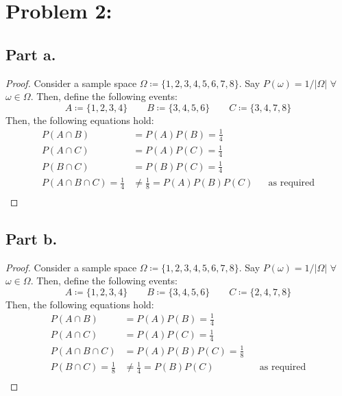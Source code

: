 \documentclass{article}
\begin{document}
\section*{Problem 2:}

\subsection*{Part a.}
\begin{proof}
Consider a sample space $\Omega \coloneqq \{1, 2, 3, 4, 5, 6, 7, 8\}$. Say $P(\omega) = 1 / |\Omega|$ $\forall$ $\omega \in \Omega$. Then, define the following events:
$$
A \coloneqq \{1, 2, 3, 4\} \qquad B \coloneqq \{3, 4, 5, 6\} \qquad C \coloneqq \{3, 4, 7, 8\}
$$
Then, the following equations hold:
\begin{align*}
P(A \cap B) &= P(A)P(B) = \frac{1}{4} \\
P(A \cap C) &= P(A)P(C) = \frac{1}{4} \\
P(B \cap C) &= P(B)P(C) = \frac{1}{4} \\
P(A \cap B \cap C) = \frac{1}{4} &\ne \frac{1}{8} = P(A)P(B)P(C) &&\text{as required} \\
\end{align*}
\end{proof}

\subsection*{Part b.}
\begin{proof}
Consider a sample space $\Omega \coloneqq \{1, 2, 3, 4, 5, 6, 7, 8\}$. Say $P(\omega) = 1 / |\Omega|$ $\forall$ $\omega \in \Omega$. Then, define the following events:
$$
A \coloneqq \{1, 2, 3, 4\} \qquad B \coloneqq \{3, 4, 5, 6\} \qquad C \coloneqq \{2, 4, 7, 8\}
$$
Then, the following equations hold:
\begin{align*}
P(A \cap B) &= P(A)P(B) = \frac{1}{4} \\
P(A \cap C) &= P(A)P(C) = \frac{1}{4} \\
P(A \cap B \cap C) &= P(A)P(B)P(C) = \frac{1}{8} \\
P(B \cap C) = \frac{1}{8} &\ne \frac{1}{4} = P(B)P(C) &&\text{as required} \\
\end{align*}
\end{proof}
\end{document}
